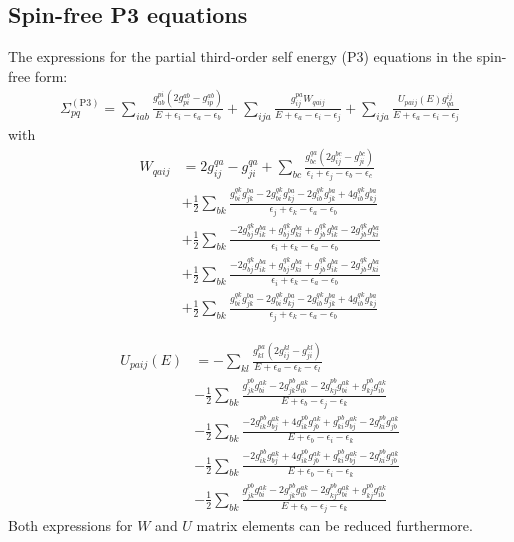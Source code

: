 \documentclass[journal=jacsat]{achemso}
\numberwithin{equation}{section}
\begin{document}
\subsection{Spin-free P3 equations}
The expressions for the partial third-order self energy (P3) equations in the spin-free form:
\begin{align}
\Sigma_{pq}^{(\text{P}3)} =\sum_{iab}\frac{g^{pi}_{ab}(2g^{ab}_{pi}-g^{ab}_{ip})}{E + \epsilon_{i}-\epsilon_{a}-\epsilon_{b}}+\sum_{ija}\frac{g^{pa}_{ij}W_{qaij}}{E + \epsilon_{a}-\epsilon_{i}-\epsilon_{j}}+\sum_{ija}\frac{U_{paij}(E)g^{ij}_{qa}}{E + \epsilon_{a}-\epsilon_{i}-\epsilon_{j}}
\end{align}
with 
\begin{align}
W_{qaij}&=2g^{qa}_{ij}-g^{qa}_{ji}+\sum_{bc}\frac{g^{qa}_{bc}(2g^{bc}_{ij}-g^{bc}_{ji})}{\epsilon_{i} + \epsilon_{j}-\epsilon_{b}-\epsilon_{c}} \\\nonumber
&+\frac{1}{2}\sum_{bk}\frac{g^{qk}_{bi}g^{ba}_{jk}-2g^{qk}_{bi}g^{ba}_{kj}-2g^{qk}_{ib}g^{ba}_{jk}+4g^{qk}_{ib}g^{ba}_{kj}}{\epsilon_{j} + \epsilon_{k}-\epsilon_{a}-\epsilon_{b}} \\\nonumber
&+\frac{1}{2}\sum_{bk}\frac{-2g^{qk}_{bj}g^{ba}_{ik}+g^{qk}_{bj}g^{ba}_{ki}+g^{qk}_{jb}g^{ba}_{ik}-2g^{qk}_{jb}g^{ba}_{ki}}{\epsilon_{i} + \epsilon_{k}-\epsilon_{a}-\epsilon_{b}} \\\nonumber
&+\frac{1}{2}\sum_{bk}\frac{-2g^{qk}_{bj}g^{ba}_{ik}+g^{qk}_{bj}g^{ba}_{ki}+g^{qk}_{jb}g^{ba}_{ik}-2g^{qk}_{jb}g^{ba}_{ki}}{\epsilon_{i} + \epsilon_{k}-\epsilon_{a}-\epsilon_{b}} \\\nonumber
&+\frac{1}{2}\sum_{bk}\frac{g^{qk}_{bi}g^{ba}_{jk}-2g^{qk}_{bi}g^{ba}_{kj}-2g^{qk}_{ib}g^{ba}_{jk}+4g^{qk}_{ib}g^{ba}_{kj}}{\epsilon_{j} + \epsilon_{k}-\epsilon_{a}-\epsilon_{b}}
\end{align}

\begin{align}
U_{paij}(E)&=-\sum_{kl}\frac{g^{pa}_{kl}(2g^{kl}_{ij}-g^{kl}_{ji})}{E + \epsilon_{a}-\epsilon_{k}-\epsilon_{l}} \\\nonumber
&-\frac{1}{2}\sum_{bk}\frac{g^{pb}_{jk}g^{ak}_{bi}-2g^{pb}_{jk}g^{ak}_{ib}-2g^{pb}_{kj}g^{ak}_{bi}+g^{pb}_{kj}g^{ak}_{ib}}{E + \epsilon_{b}-\epsilon_{j}-\epsilon_{k}} \\\nonumber
&-\frac{1}{2}\sum_{bk}\frac{-2g^{pb}_{ik}g^{ak}_{bj}+4g^{pb}_{ik}g^{ak}_{jb}+g^{pb}_{ki}g^{ak}_{bj}-2g^{pb}_{ki}g^{ak}_{jb}}{E + \epsilon_{b}-\epsilon_{i}-\epsilon_{k}} \\\nonumber
&-\frac{1}{2}\sum_{bk}\frac{-2g^{pb}_{ik}g^{ak}_{bj}+4g^{pb}_{ik}g^{ak}_{jb}+g^{pb}_{ki}g^{ak}_{bj}-2g^{pb}_{ki}g^{ak}_{jb}}{E + \epsilon_{b}-\epsilon_{i}-\epsilon_{k}} \\\nonumber
&-\frac{1}{2}\sum_{bk}\frac{g^{pb}_{jk}g^{ak}_{bi}-2g^{pb}_{jk}g^{ak}_{ib}-2g^{pb}_{kj}g^{ak}_{bi}+g^{pb}_{kj}g^{ak}_{ib}}{E + \epsilon_{b}-\epsilon_{j}-\epsilon_{k}}
\end{align}
Both expressions for $W$ and $U$ matrix elements can be reduced furthermore.
\end{document}
